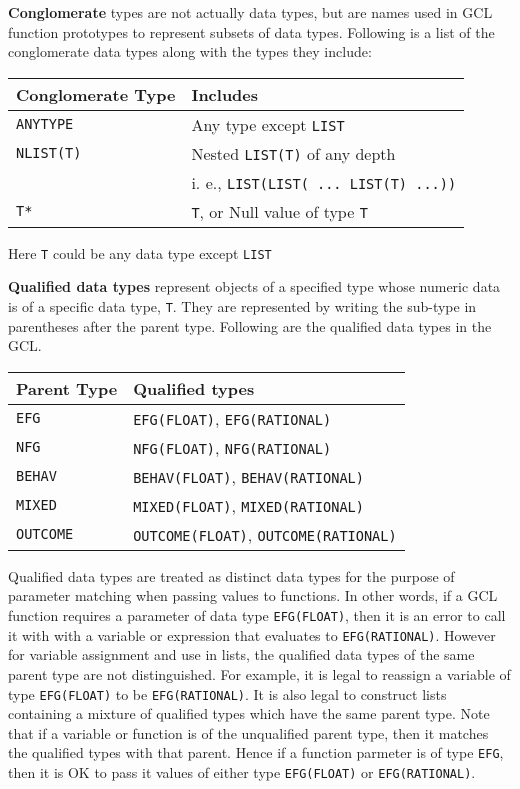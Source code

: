 \medskip
\noindent
{\bf Conglomerate} types are not actually data types, but are names
used in GCL function prototypes to represent subsets of data types.
Following is a list of the conglomerate data types along with the
types they include:  

\medskip
\begin{center}
\begin{tabular} {|l|l|}
\hline 
Conglomerate Type & Includes \\
\hline
\verb+ANYTYPE+ & Any type except \verb+LIST+ \\ 
\verb+NLIST(T)+ & Nested \verb+LIST(T)+ of any depth \\ 
& i. e., \verb+LIST(LIST( ... LIST(T) ...))+\\
\verb+T*+ & \verb+T+, or Null value of type \verb+T+ \\ 
\hline
\end{tabular}
\end{center}
\medskip

\noindent
Here \verb+T+ could be any data type except \verb+LIST+


\medskip
\noindent
{\bf Qualified data types} represent objects of a specified type whose
numeric data is of a specific data type, \verb+T+.  They are
represented by writing the sub-type in parentheses after the parent
type.  Following are the qualified data types in the GCL.

\medskip
\begin{center}
\begin{tabular} {|l|l|} 
\hline
Parent Type & Qualified types\\
\hline
\verb+EFG+ & \verb+EFG(FLOAT)+, \verb+EFG(RATIONAL)+ \\ 
\verb+NFG+ & \verb+NFG(FLOAT)+, \verb+NFG(RATIONAL)+ \\ 
\verb+BEHAV+ & \verb+BEHAV(FLOAT)+, \verb+BEHAV(RATIONAL)+ \\ 
\verb+MIXED+ & \verb+MIXED(FLOAT)+, \verb+MIXED(RATIONAL)+ \\ 
\verb+OUTCOME+ & \verb+OUTCOME(FLOAT)+, \verb+OUTCOME(RATIONAL)+ \\ 
\hline
\end{tabular}
\end{center}
\medskip

Qualified data types are treated as distinct data types for the
purpose of parameter matching when passing values to functions.  In
other words, if a GCL function requires a parameter of data type
\verb+EFG(FLOAT)+, then it is an error to call it with with a variable
or expression that evaluates to \verb+EFG(RATIONAL)+.  However for
variable assignment and use in lists, the qualified data types of the
same parent type are not distinguished. For example, it is legal to
reassign a variable of type \verb+EFG(FLOAT)+ to be
\verb+EFG(RATIONAL)+.  It is also legal to construct lists containing
a mixture of qualified types which have the same parent type.  Note
that if a variable or function is of the unqualified parent type, then
it matches the qualified types with that parent. Hence if a function
parmeter is of type \verb+EFG+, then it is OK to pass it values of
either type \verb+EFG(FLOAT)+ or \verb+EFG(RATIONAL)+.

